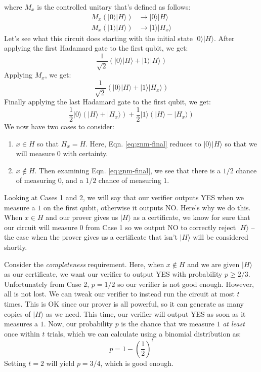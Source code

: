 \documentclass[11pt]{article}
\newcommand{\ket}[1]{\lvert #1 \rangle}
\def\fill{   \hfill}
\begin{document}
where $M_x$ is the controlled unitary that's defined as follows:
\begin{equation*} \label{eq:gnm-mx}
\begin{split}
M_x\left(\ket{0}\ket{H}\right) &\rightarrow \ket{0}\ket{H} \\
M_x\left(\ket{1}\ket{H}\right) &\rightarrow \ket{1}\ket{H_x}
\end{split}
\end{equation*}
Let's see what this circuit does starting with the initial state $\ket{0}\ket{H}$. After applying the first Hadamard gate to the first qubit, we get:
\begin{equation*}
\frac{1}{\sqrt{2}}(\ket{0}\ket{H} + \ket{1}\ket{H})
\end{equation*}
Applying $M_x$, we get:
\begin{equation*}
\frac{1}{\sqrt{2}}(\ket{0}\ket{H} + \ket{1}\ket{H_x})
\end{equation*}
Finally applying the last Hadamard gate to the first qubit, we get:
\begin{equation} \label{eq:gnm-final}
\frac{1}{2}
  \ket{0}\left(\ket{H} + \ket{H_x}\right)
+ \frac{1}{2}
\ket{1}\left(\ket{H} - \ket{H_x}\right)
\end{equation}
We now have two cases to consider:
\begin{enumerate}
\item $x \in H$ so that $H_x = H$. Here, Eqn. \ref{eq:gnm-final} reduces to $\ket{0}\ket{H}$ so that we will measure $0$ with certainty.

\item $x \notin H$. Then examining Eqn. \ref{eq:gnm-final}, we see that there is a $1/2$ chance of measuring $0$, and a $1/2$ chance of measuring $1$.
\end{enumerate}
Looking at Cases 1 and 2, we will say that our verifier outputs YES when we measure a $1$ on the first qubit, otherwise it outputs NO. Here's why we do this. When $x \in H$ and our prover gives us $\ket{H}$ as a certificate, we know for sure that our circuit will measure $0$ from Case 1 so we output NO to correctly reject $\ket{H}$ -- the case when the prover gives us a certificate that isn't $\ket{H}$ will be considered shortly.

\fill

\noindent Consider the \emph{completeness} requirement. Here, when $x \notin H$ and we are given $\ket{H}$ as our certificate, we want our verifier to output YES with probability $p \geq 2/3$. Unfortunately from Case 2, $p = 1/2$ so our verifier is not good enough. However, all is not lost. We can tweak our verifier to instead run the circuit at most $t$ times. This is OK since our prover is all powerful, so it can generate as many copies of $\ket{H}$ as we need. This time, our verifier will output YES as soon as it measures a $1$. Now, our probability $p$ is the chance that we measure $1$ \emph{at least} once within $t$ trials, which we can calculate using a binomial distribution as:
\begin{equation*}
p = 1 - \left(\frac{1}{2}\right)^t
\end{equation*} 
Setting $t = 2$ will yield $p = 3/4$, which is good enough.
\end{document}
